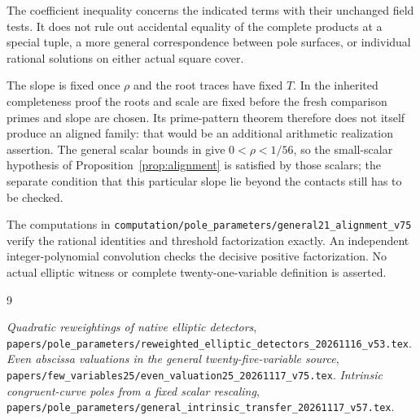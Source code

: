 \documentclass[10pt,a4paper]{article}
\begin{document}
The coefficient inequality concerns the indicated terms with their
unchanged field tests. It does not rule out accidental equality
of the complete products at a special tuple, a more general
correspondence between pole surfaces, or individual rational
solutions on either actual square cover.

The slope is fixed once $\rho$ and the root traces have fixed $T$.
In the inherited completeness proof the roots and scale are fixed
before the fresh comparison primes and slope are chosen. Its
prime-pattern theorem therefore does not itself produce an aligned
family: that would be an additional arithmetic realization assertion.
The general scalar bounds in \cite{Scalar} give
$0<\rho<1/56$, so the small-scalar hypothesis of
Proposition~\ref{prop:alignment} is satisfied by those scalars; the
separate condition that this particular slope lie beyond the contacts
still has to be checked.

The computations in
\nolinkurl{computation/pole_parameters/general21_alignment_v75}
verify the rational identities and threshold factorization exactly.
An independent integer-polynomial convolution checks the decisive
positive factorization. No actual elliptic witness or complete
twenty-one-variable definition is asserted.

\begin{thebibliography}{9}\raggedright
{}\emph{Quadratic reweightings of native elliptic detectors},
\nolinkurl{papers/pole_parameters/reweighted_elliptic_detectors_20261116_v53.tex}.
\emph{Even abscissa valuations in the general twenty-five-variable source},
\nolinkurl{papers/few_variables25/even_valuation25_20261117_v75.tex}.
\emph{Intrinsic congruent-curve poles from a fixed scalar rescaling},
\nolinkurl{papers/pole_parameters/general_intrinsic_transfer_20261117_v57.tex}.
\end{thebibliography}
\end{document}
